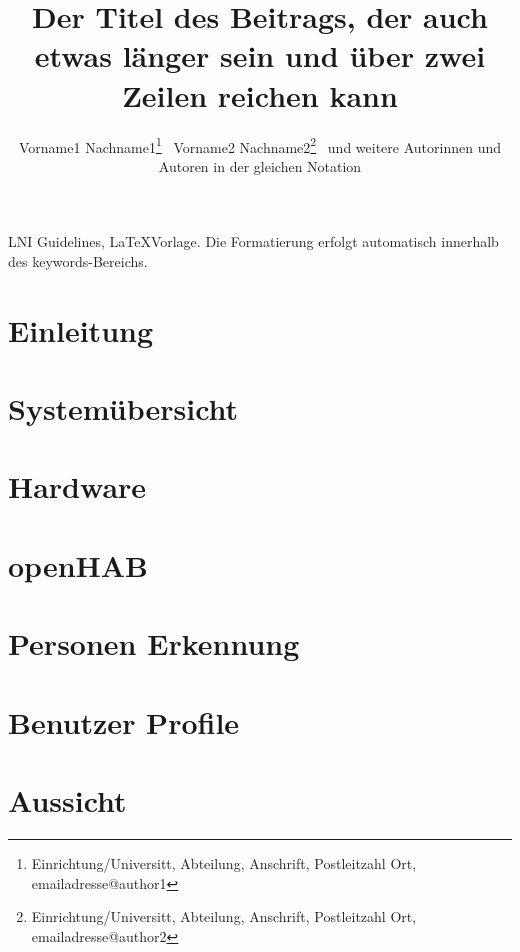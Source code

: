 \documentclass{lni}
\author{Vorname1 Nachname1\footnote{Einrichtung/Universitt, Abteilung, Anschrift, Postleitzahl Ort, emailadresse@author1} \, Vorname2 Nachname2\footnote{Einrichtung/Universitt, Abteilung, Anschrift, Postleitzahl Ort, emailadresse@author2} \ und weitere Autorinnen und Autoren in der gleichen Notation}
\title{Der Titel des Beitrags, der auch etwas länger sein und über zwei Zeilen reichen kann}
\renewcommand{\headrulewidth}{0.4pt} %
\begin{document}
\maketitle
\renewcommand{\refname}{Literaturverzeichnis}
\setcounter{footnote}{2} %

\begin{abstract}

\end{abstract}
\begin{keywords}
LNI Guidelines, \LaTeX Vorlage. Die Formatierung erfolgt automatisch innerhalb des keywords-Bereichs.
\end{keywords}

\section{Einleitung}


\pagestyle{fancy}
\fancyhead{} %
\fancyfoot{} %
\renewcommand{\headrulewidth}{0.4pt} %


\section{Systemübersicht}


\section{Hardware}


\section{openHAB}


\section{Personen Erkennung}


\section{Benutzer Profile}


\section{Aussicht}




\end{document}
